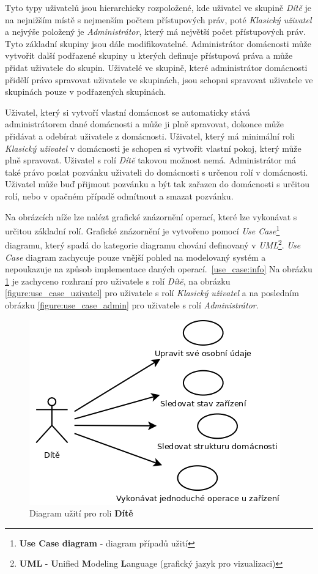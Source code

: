 Tyto typy uživatelů jsou hierarchicky rozpoložené, kde uživatel ve skupině \emph{Dítě} je na nejnižším místě s nejmenším počtem přístupových práv, poté \emph{Klasický uživatel} a nejvýše položený je \emph{Administrátor}, který má největší počet přístupových práv.
Tyto základní skupiny jsou dále modifikovatelné. Administrátor domácnosti může vytvořit další podřazené skupiny u kterých definuje přístupová práva a může přidat uživatele do skupin.
Uživatelé ve skupině, které administrátor domácnosti přidělí právo spravovat uživatele ve skupinách, jsou schopni spravovat uživatele ve skupinách pouze v podřazených skupinách.

Uživatel, který si vytvoří vlastní domácnost se automaticky stává administrátorem dané domácnosti a může ji plně spravovat, dokonce může přidávat a odebírat uživatele z domácnosti.
Uživatel, který má minimální roli \emph{Klasický uživatel} v domácnosti je schopen si vytvořit vlastní pokoj, který může plně spravovat. Uživatel s rolí \emph{Dítě} takovou možnost nemá.
Administrátor má také právo poslat pozvánku uživateli do domácnosti s určenou rolí v domácnosti. Uživatel může buď přijmout pozvánku a být tak zařazen do domácnosti s určitou rolí, nebo v opačném případě odmítnout a smazat pozvánku.
\newline

Na obrázcích níže lze nalézt grafické znázornění operací, které lze vykonávat s určitou základní rolí.
Grafické znázornění je vytvořeno pomocí \emph{Use Case}\footnote{\textbf{Use Case diagram} - diagram případů užití} diagramu, který spadá do kategorie diagramu chování definovaný v \emph{UML}\footnote{\textbf{UML} - \textbf{U}nified \textbf{M}odeling \textbf{L}anguage (grafický jazyk pro vizualizaci)}.
\emph{Use Case} diagram zachycuje pouze vnější pohled na modelovaný systém a nepoukazuje na způsob implementace daných operací.~\ref{use_case:info}
Na obrázku \ref{figure:use_case_dite} je zachyceno rozhraní pro uživatele s rolí \emph{Dítě}, na obrázku \ref{figure:use_case_uzivatel} pro uživatele s rolí \emph{Klasický uživatel} a na posledním obrázku \ref{figure:use_case_admin} pro uživatele s rolí \emph{Administrátor}.

\begin{figure}[hbt]
  \centering
  \includegraphics[width=0.4 \linewidth]{obrazky-figures/useCaseChild.png}
  \caption{Diagram užití pro roli \textbf{Dítě}}
  \label{figure:use_case_dite}
\end{figure}

